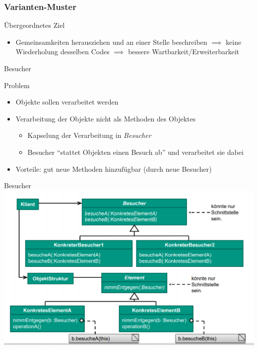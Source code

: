 \documentclass[18pt]{beamer}
\begin{document}
	
	\begin{frame}
		\frametitle{Varianten-Muster}
		\begin{block}{Übergeordnetes Ziel}
			\begin{itemize}
				\item Gemeinsamkeiten herausziehen und an einer Stelle beschreiben \pause
				\linebreak $\implies$ keine Wiederholung desselben Codes \pause
				\linebreak $\implies$ bessere Wartbarkeit/Erweiterbarkeit		
			\end{itemize}
		\end{block}
	\end{frame}

	\begin{frame}{Besucher}
		\begin{block}{Problem}
			\begin{itemize}
				\item Objekte sollen verarbeitet werden
				\item Verarbeitung der Objekte nicht als Methoden des Objektes
				\begin{itemize}
					\item Kapselung der Verarbeitung in \emph{Besucher}
					\item Besucher  \enquote{stattet Objekten einen Besuch ab} und verarbeitet sie dabei
				\end{itemize}
				\item Vorteile: gut neue Methoden hinzufügbar (durch neue Besucher)
			\end{itemize}
		\end{block}
	\end{frame}

	\begin{frame}{Besucher}
		\centering
		\includegraphics[scale=0.45]{pics/tut4/vis.png}
	\end{frame}
\end{document}
